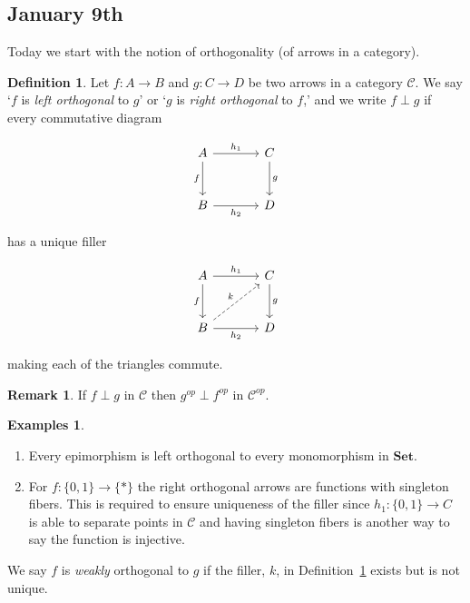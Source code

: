 \documentclass[11pt]{amsart}
\theoremstyle{plain}
\theoremstyle{definition}
\newtheorem{defn}[thm]{Definition}
\newtheorem*{rem*}{Remark}
\newtheorem*{egs*}{Examples}
\newcommand{\cC}{{\mathcal C}}
\newcommand{\Set}{{\mathbf{Set}}}
\newcommand{\noi}{{\noindent}}
\begin{document}
\subsection{January 9th}

Today we start with the notion of orthogonality (of arrows in a category). 

\begin{defn}\label{def orthogonal arrows}
Let $f : A \to B$ and $g : C \to D$ be two arrows in a category $\cC$. We say `$f$ is \textit{left orthogonal} to $g$' or `$g$ is \textit{right orthogonal} to $f${,}' and we write $f \perp g$ if every commutative diagram 

\[ \begin{tikzcd}[column sep = large , row sep = large]
  A \dar["f"'] \rar["h_1"] & C\dar["g"] \\
  B \rar["h_2"'] & D
\end{tikzcd}\]

\noi has a unique filler 

\[ \begin{tikzcd}[column sep = large , row sep = large]
  A \dar["f"'] \rar["h_1"] & C\dar["g"] \\
  B \ar[ur, dashed, "k"] \rar["h_2"'] & D
\end{tikzcd}\]

\noi making each of the triangles commute. 
\end{defn}

\begin{rem*}
If $f \perp g$ in $\cC$ then $g^{op} \perp f^{op}$ in $\cC^{op}$. 
\end{rem*}

\begin{egs*}\
\begin{enumerate}[label=(\alph*)]
\item Every epimorphism is left orthogonal to every monomorphism in $\Set$. 
\item For $f : \{0,1\} \to \{ *\}$ the right orthogonal arrows are functions with singleton fibers. This is required to ensure uniqueness of the filler since $h_1 : \{0,1\} \to C$ is able to separate points in $\cC$ and having singleton fibers is another way to say the function is injective. 
\end{enumerate}
\end{egs*}

\noi We say $f$ is \textit{weakly} orthogonal to $g$ if the filler, $k$, in Definition~\ref{def orthogonal arrows} exists but is not unique. 
\end{document}
